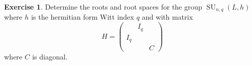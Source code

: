 \documentclass[12pt]{article}
\theoremstyle{definition}
\newtheorem{exercise}[theorem]{Exercise}
\numberwithin{theorem}{subsection}
\newcommand{\sig}{\sigma}
\newcommand{\tbf}{\textbf}
\newcommand{\noi}{\noindent}
\newcommand{\ov}{\overline}
\newcommand{\frakg}{\mathfrak{g}}
\DeclareMathOperator{\SU}{SU}
\DeclareMathOperator{\Tr}{Tr}
\begin{document}
\begin{exercise}
Determine the roots and root spaces for the group $\SU_{n,q}(L,h)$ where $h$ is the hermitian form Witt index $q$ and with matrix
\[
	H =
	\begin{pmatrix}
		& I_q\\
		I_q \\
		&& C
	\end{pmatrix}
\]
where $C$ is diagonal.
\end{exercise}
%
%
%
%
%
\end{document}
